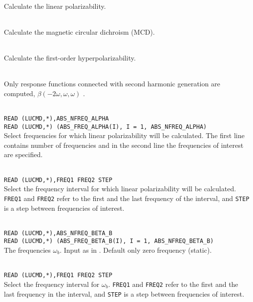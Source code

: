 \begin{description}
\item{} \\
Calculate the linear polarizability.

\item{} \\
Calculate the magnetic circular dichroism (MCD).

\item{}\\
Calculate the first-order hyperpolarizability.

\item{}\\
Only response functions connected with second harmonic
generation
are computed, $\beta(-2\omega,\omega,\omega)$ .

\item{} \\
\verb|READ (LUCMD,*),ABS_NFREQ_ALPHA |\\
\verb|READ (LUCMD,*) (ABS_FREQ_ALPHA(I), I = 1, ABS_NFREQ_ALPHA) | \\
Select frequencies for which linear polarizability will be calculated.
The first line contains number of frequencies and in the second line the
frequencies of interest are specified.

\item{} \\
\verb|READ (LUCMD,*),FREQ1 FREQ2 STEP |\\
Select the frequency interval for which linear polarizability will be calculated.
\verb|FREQ1| and \verb|FREQ2| refer to the first and the last frequency of
the interval, and \verb|STEP| is a step between frequencies of interest.

\item{} \\
\verb|READ (LUCMD,*),ABS_NFREQ_BETA_B |\\
\verb|READ (LUCMD,*) (ABS_FREQ_BETA_B(I), I = 1, ABS_NFREQ_BETA_B) | \\
The frequencies
$\omega_b$. Input as in .
Default only zero frequency (static).

\item{} \\
\verb|READ (LUCMD,*),FREQ1 FREQ2 STEP |\\
Select the frequency interval for $\omega_b$.
\verb|FREQ1| and \verb|FREQ2| refer to the first and the last frequency in
the interval, and \verb|STEP| is a step between frequencies of interest.


\end{description}
